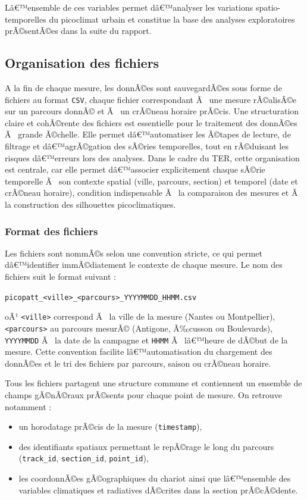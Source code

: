 \documentclass{article}
\begin{document}
Lâ€™ensemble de ces variables permet dâ€™analyser les variations spatio-temporelles du picoclimat urbain et constitue la base des analyses exploratoires prÃ©sentÃ©es dans la suite du rapport.

\newpage

\subsection{Organisation des fichiers}

A la fin de chaque mesure, les donnÃ©es sont sauvegardÃ©es sous forme de fichiers au format \texttt{CSV}, chaque fichier correspondant Ã  une mesure rÃ©alisÃ©e sur un parcours donnÃ© et Ã  un crÃ©neau horaire prÃ©cis. Une structuration claire et cohÃ©rente des fichiers est essentielle pour le traitement des donnÃ©es Ã  grande Ã©chelle. Elle permet dâ€™automatiser les Ã©tapes de lecture, de filtrage et dâ€™agrÃ©gation des sÃ©ries temporelles, tout en rÃ©duisant les risques dâ€™erreurs lors des analyses. Dans le cadre du TER, cette organisation est centrale, car elle permet dâ€™associer explicitement chaque sÃ©rie temporelle Ã  son contexte spatial (ville, parcours, section) et temporel (date et crÃ©neau horaire), condition indispensable Ã  la comparaison des mesures et Ã  la construction des silhouettes picoclimatiques.

\subsubsection{Format des fichiers}
Les fichiers sont nommÃ©s selon une convention stricte, ce qui permet dâ€™identifier immÃ©diatement le contexte de chaque mesure.
Le nom des fichiers suit le format suivant :
\begin{center}
\texttt{picopatt\_<ville>\_<parcours>\_YYYYMMDD\_HHMM.csv}
\end{center}

\noindent oÃ¹ \texttt{<ville>} correspond Ã  la ville de la mesure (Nantes ou Montpellier), \texttt{<parcours>} au parcours mesurÃ© (Antigone, Ã‰cusson ou Boulevards), \texttt{YYYYMMDD} Ã  la date de la campagne et \texttt{HHMM} Ã  lâ€™heure de dÃ©but de la mesure. Cette convention facilite lâ€™automatisation du chargement des donnÃ©es et le tri des fichiers par parcours, saison ou crÃ©neau horaire.

\medskip

Tous les fichiers partagent une structure commune et contiennent un ensemble de champs gÃ©nÃ©raux prÃ©sents pour chaque point de mesure. On retrouve notamment :
\begin{itemize}[noitemsep]
    \item un horodatage prÃ©cis de la mesure (\texttt{timestamp}),
    \item des identifiants spatiaux permettant le repÃ©rage le long du parcours (\texttt{track\_id}, \texttt{section\_id}, \texttt{point\_id}),
    \item les coordonnÃ©es gÃ©ographiques du chariot ainsi que lâ€™ensemble des variables climatiques et radiatives dÃ©crites dans la section prÃ©cÃ©dente.
\end{itemize}
\end{document}

